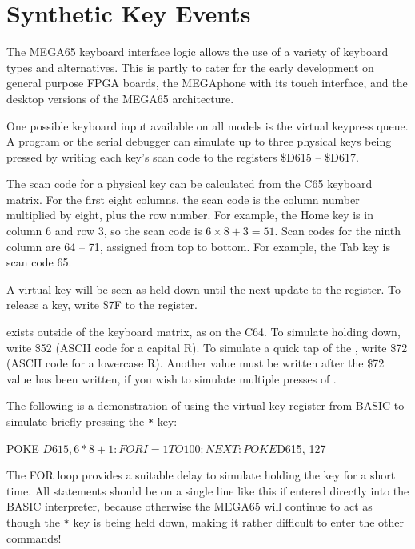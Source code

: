 \section{Synthetic Key Events}

The MEGA65 keyboard interface logic allows the use of a variety of keyboard types and alternatives. This is partly
to cater for the early development on general purpose FPGA boards, the MEGAphone with its touch interface, and the
desktop versions of the MEGA65 architecture.

One possible keyboard input available on all models is the virtual keypress queue. A program or the serial debugger can simulate up to three physical keys being pressed by writing each key's scan code to the registers \$D615 -- \$D617.

The scan code for a physical key can be calculated from the C65 keyboard matrix. For the first eight columns, the scan code is the column number multiplied by eight, plus the row number. For example, the Home key is in column 6 and row 3, so the scan code is $6 \times 8 + 3 = 51$. Scan codes for the ninth column are 64 -- 71, assigned from top to bottom. For example, the Tab key is scan code 65.

A virtual key will be seen as held down until the next update to the register. To release a key, write \$7F to the register.

 exists outside of the keyboard matrix, as on the C64. To simulate holding  down, write \$52 (ASCII code for a capital R). To simulate a quick tap of the , write \$72 (ASCII code for a lowercase R). Another value must be written after the \$72 value has been written, if you wish to simulate multiple presses of .

The following is a demonstration of using the virtual key register from BASIC to simulate briefly pressing the \texttt{*} key:

\begin{basiccode}
POKE $D615, 6*8+1:FOR I = 1 TO 100:NEXT:POKE $D615, 127
\end{basiccode}

The FOR loop provides a suitable delay to simulate holding the key for a short time. All statements should be on a single line like this if entered directly into the BASIC interpreter, because otherwise the MEGA65 will continue to act as though the \texttt{*} key is being held down, making it rather difficult to enter the other commands!

